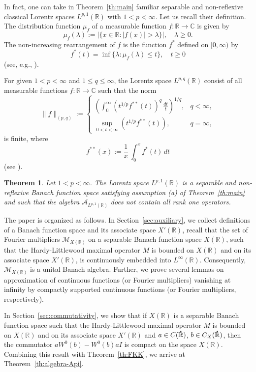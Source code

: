 \documentclass[reqno]{amsproc}
\newcommand{\cA}{\mathcal{A}}
\newcommand{\cM}{\mathcal{M}}
\newcommand{\dR}{{\bf\dot{\R}}}
\newcommand{\C}{\mathbb{C}}
\newcommand{\R}{\mathbb{R}}
\newtheorem{theorem}{Theorem}[section]
\theoremstyle{definition}
\theoremstyle{remark}
\numberwithin{equation}{section}
\begin{document}
In fact, one can take in Theorem~\ref{th:main}
familiar separable and non-reflexive classical Lorentz 
spaces $L^{p,1}(\R)$ with $1<p<\infty$. Let us recall their 
definition. The distribution function $\mu_f$ of a
measurable function $f:\R\to\C$ is given by
\[
\mu_f(\lambda):=|\{x\in\R:|f(x)|>\lambda\}|,
\quad\lambda\ge 0.
\]
The non-increasing
rearrangement of $f$ is the function $f^*$ defined on $[0,\infty)$ by
\[
f^*(t)=\inf\{\lambda:\mu_f(\lambda)\le t\},
\quad t\ge 0
\]
(see, e.g., \cite[Chap.~3, Definitions 1.1 and 1.5]{BS88}).

For given $1 < p < \infty$ and $1 \le q \le \infty$, the Lorentz
space $L^{p, q}(\mathbb{R})$ consist of all measurable 
functions  $f : \mathbb{R} \to \mathbb{C}$ such that the norm
\[
\|f\|_{(p, q)} 
:=  
\left\{\begin{array}{cl}
\displaystyle\left(\int_0^\infty \left(t^{1/p} f^{**}(t)\right)^q\, 
\frac{dt}{t}\right)^{1/q},     
&  q < \infty,
\\[3mm]
\displaystyle\sup_{0 < t < \infty} \left(t^{1/p} f^{**}(t)\right),   
&   q = \infty,
\end{array}\right.
\]
is finite, where 
\[
f^{**}(x) := \frac1x\, \int_0^x f^*(t)\, dt
\]
(see \cite[Chap.~4, Lemma 4.5]{BS88}).
\begin{theorem}\label{th:main-Lorentz}
Let $1<p<\infty$. The Lorentz space $L^{p,1}(\R)$ is a separable
and non-reflexive Banach function space satisfying assumption {\rm(a)}
of Theorem~{\rm\ref{th:main}} and such that the algebra $\cA_{L^{p,1}(\R)}$ 
does not contain all rank one operators.
\end{theorem}
The paper is organized as follows. 
In Section~\ref{sec:auxiliary}, we collect definitions of a Banach function
space and its associate space $X'(\R)$, recall that the set of Fourier
multipliers $\cM_{X(\R)}$ on a separable Banach function space $X(\R)$, 
such that the Hardy-Littlewood maximal operator $M$ is bounded on $X(\R)$
and on its associate space $X'(\R)$, is continuously embedded into 
$L^\infty(\R)$. Consequently, $\cM_{X(\R)}$ is a unital Banach algebra.
Further, we prove several lemmas on approximation of continuous
functions (or Fourier multipliers) vanishing at infinity by
compactly supported continuous functions (or Fourier multipliers, respectively).

In Section~\ref{sec:commutativity}, we show that if $X(\R)$ is a
separable Banach function space  such that the Hardy-Littlewood maximal 
operator $M$ is bounded on $X(\R)$ and on its associate space $X'(\R)$
and $a\in C(\dR)$, $b\in C_X(\dR)$, then the commutator
$aW^0(b)-W^0(b)aI$ is compact on the space $X(\R)$. Combining this result 
with Theorem~\ref{th:FKK}, we arrive at Theorem~\ref{th:algebra-Api}.
\end{document}
